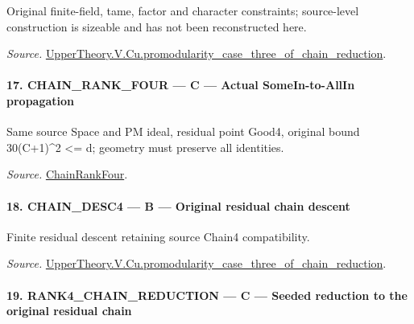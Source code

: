 Original finite-field, tame, factor and character constraints; source-level construction is sizeable and has not been reconstructed here.

\emph{Source.} \href{https://github.com/CocoSgt/riemann-hypothesis-lean/blob/7cbf7a0c32fca1badf05931879a37c3f8a2b03b4/src/Development/AutomorphicArithmetic/AutomorphicVarieties/ModularityArgument/ThresholdArguments/DenseThresholdCases/PromodularityCaseThreeOfLemmas.lean#L131-L153}{UpperTheory.V.Cu.promodularity\_\allowbreak case\_\allowbreak three\_\allowbreak of\_\allowbreak chain\_\allowbreak reduction}.



\paragraph{17. CHAIN\_\allowbreak RANK\_\allowbreak FOUR — C — Actual SomeIn-to-AllIn propagation}

Same source Space and PM ideal, residual point Good4, original bound 30(C+1)\textasciicircum{}2 <= d; geometry must preserve all identities.

\emph{Source.} \href{https://github.com/CocoSgt/riemann-hypothesis-lean/blob/7cbf7a0c32fca1badf05931879a37c3f8a2b03b4/src/Development/AutomorphicArithmetic/AutomorphicVarieties/ModularityArgument/ThresholdArguments/DenseThresholdCases/PromodularityCaseThree.lean#L26-L32}{ChainRankFour}.



\paragraph{18. CHAIN\_\allowbreak DESC4 — B — Original residual chain descent}

Finite residual descent retaining source Chain4 compatibility.

\emph{Source.} \href{https://github.com/CocoSgt/riemann-hypothesis-lean/blob/7cbf7a0c32fca1badf05931879a37c3f8a2b03b4/src/Development/AutomorphicArithmetic/AutomorphicVarieties/ModularityArgument/ThresholdArguments/DenseThresholdCases/PromodularityCaseThreeOfLemmas.lean#L131-L153}{UpperTheory.V.Cu.promodularity\_\allowbreak case\_\allowbreak three\_\allowbreak of\_\allowbreak chain\_\allowbreak reduction}.



\paragraph{19. RANK4\_\allowbreak CHAIN\_\allowbreak REDUCTION — C — Seeded reduction to the original residual chain}

